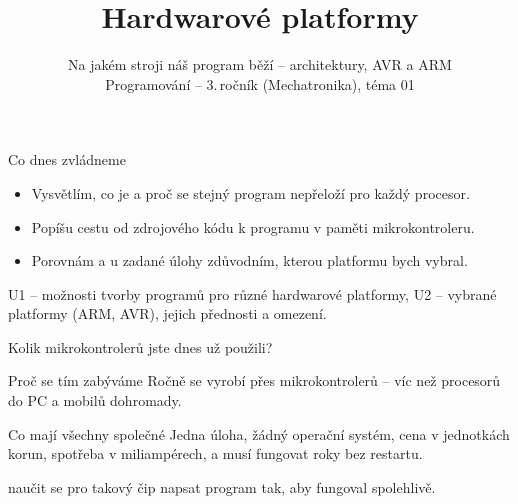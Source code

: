 \documentclass[12pt,aspectratio=169]{beamer}
\title{Hardwarové platformy}
\subtitle{Na jakém stroji náš program běží -- architektury, AVR a ARM \\
  Programování -- 3.\,ročník (Mechatronika), téma 01}
\begin{document}
\maketitle

\begin{keyframe}{Co dnes zvládneme}
  \begin{itemize}
    \item Vysvětlím, co je  a proč se stejný program
          nepřeloží pro každý procesor.
    \item Popíšu cestu od zdrojového kódu k programu v paměti mikrokontroleru.
    \item Porovnám  a u zadané úlohy zdůvodním, kterou platformu bych vybral.
  \end{itemize}
  \vfill
   U1 -- možnosti tvorby programů pro různé hardwarové platformy,
  U2 -- vybrané platformy (ARM, AVR), jejich přednosti a omezení.
\end{keyframe}

\begin{frame}{Kolik mikrokontrolerů jste dnes už použili?}
  \vspace{-2mm}
  \begin{center}
  \end{center}
\end{frame}

\begin{frame}{Proč se tím zabýváme}
  Ročně se vyrobí přes  mikrokontrolerů -- víc než procesorů
  do PC a mobilů dohromady.

  \vspace{4mm}
  \begin{block}{Co mají všechny společné}
    Jedna úloha, žádný operační systém, cena v jednotkách korun, spotřeba
    v miliampérech, a musí fungovat roky bez restartu.
  \end{block}

  \vspace{4mm}
   naučit se pro takový čip napsat program tak, aby fungoval
  spolehlivě.
\end{frame}
\end{document}

